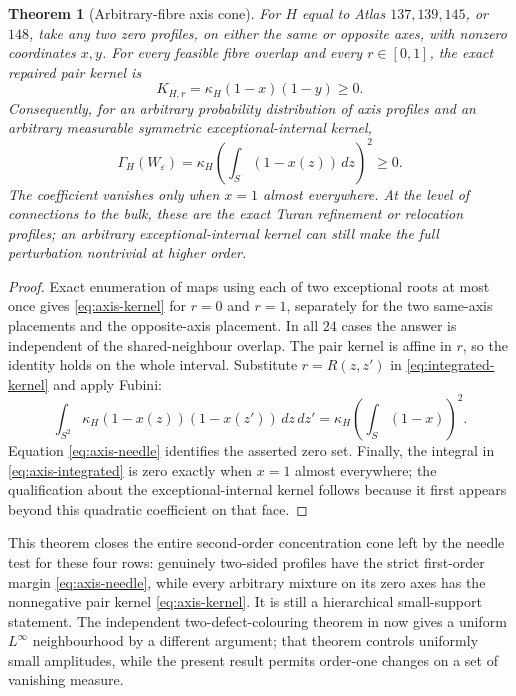 \documentclass[11pt]{article}
\newtheorem{theorem}{Theorem}[section]
\begin{document}
\begin{theorem}[Arbitrary-fibre axis cone]
\label{thm:axis-cone}
For $H$ equal to Atlas $137,139,145$, or $148$, take any two zero profiles,
on either the same or opposite axes, with nonzero coordinates $x,y$.  For
every feasible fibre overlap and every $r\in[0,1]$, the exact repaired pair
kernel is
\begin{equation}
 K_{H,r}=\kappa_H(1-x)(1-y)\geq0.
 \label{eq:axis-kernel}
\end{equation}
Consequently, for an arbitrary probability distribution of axis profiles and
an arbitrary measurable symmetric exceptional-internal kernel,
\begin{equation}
 [\varepsilon^2]\Gamma_H(W_\varepsilon)
 =\kappa_H\left(\int_S(1-x(z))\,dz\right)^2\geq0.
 \label{eq:axis-integrated}
\end{equation}
The coefficient vanishes only when $x=1$ almost everywhere.  At the level of
connections to the bulk, these are the exact Turan refinement or relocation
profiles; an arbitrary exceptional-internal kernel can still make the full
perturbation nontrivial at higher order.
\end{theorem}

\begin{proof}
Exact enumeration of maps using each of two exceptional roots at most once
gives \eqref{eq:axis-kernel} for $r=0$ and $r=1$, separately for the two
same-axis placements and the opposite-axis placement.  In all $24$ cases the
answer is independent of the shared-neighbour overlap.  The pair kernel is
affine in $r$, so the identity holds on the whole interval.  Substitute
$r=R(z,z')$ in \eqref{eq:integrated-kernel} and apply Fubini:
\[
 \int_{S^2}\kappa_H(1-x(z))(1-x(z'))\,dz\,dz'
 =\kappa_H\left(\int_S(1-x)\right)^2.
\]
Equation \eqref{eq:axis-needle} identifies the asserted zero set.  Finally,
the integral in \eqref{eq:axis-integrated} is zero exactly when $x=1$ almost
everywhere; the qualification about the exceptional-internal kernel follows
because it first appears beyond this quadratic coefficient on that face.
\end{proof}

This theorem closes the entire second-order concentration cone left by the
needle test for these four rows: genuinely two-sided profiles have the strict
first-order margin \eqref{eq:axis-needle}, while every arbitrary mixture on
its zero axes has the nonnegative pair kernel \eqref{eq:axis-kernel}.  It is
still a hierarchical small-support statement.  The independent
two-defect-colouring theorem in
 now gives a uniform
$L^\infty$ neighbourhood by a different argument; that theorem controls
uniformly small amplitudes, while the present result permits order-one
changes on a set of vanishing measure.
\end{document}
